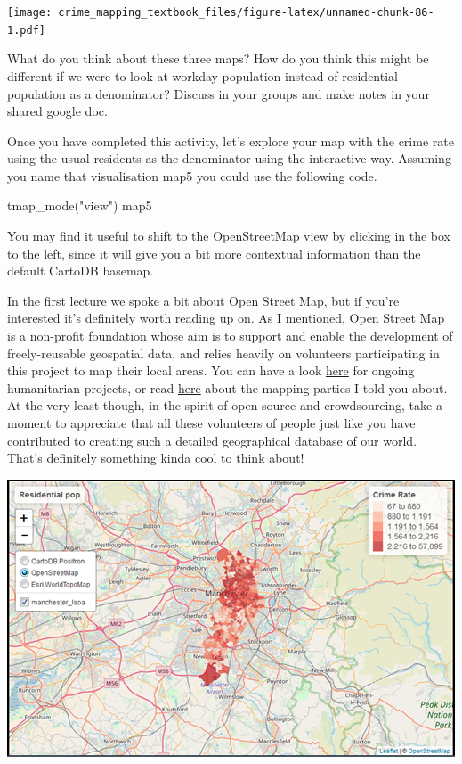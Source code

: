\documentclass[
]{book}
\newenvironment{Shaded}{\begin{snugshade}}{\end{snugshade}}
\newcommand{\FunctionTok}[1]{\textcolor[rgb]{0.00,0.00,0.00}{#1}}
\newcommand{\NormalTok}[1]{#1}
\newcommand{\StringTok}[1]{\textcolor[rgb]{0.31,0.60,0.02}{#1}}
\begin{document}
\texttt{[image: crime\_mapping\_textbook\_files/figure-latex/unnamed-chunk-86-1.pdf]}

What do you think about these three maps? How do you think this might be different if we were to look at workday population instead of residential population as a denominator? Discuss in your groups and make notes in your shared google doc.

Once you have completed this activity, let's explore your map with the crime rate using the usual residents as the denominator using the interactive way. Assuming you name that visualisation map5 you could use the following code.

\begin{Shaded}
\begin{Highlighting}[]
\FunctionTok{tmap\_mode}\NormalTok{(}\StringTok{"view"}\NormalTok{)}
\NormalTok{map5}
\end{Highlighting}
\end{Shaded}

You may find it useful to shift to the OpenStreetMap view by clicking in the box to the left, since it will give you a bit more contextual information than the default CartoDB basemap.

In the first lecture we spoke a bit about Open Street Map, but if you're interested it's definitely worth reading up on. As I mentioned, Open Street Map is a non-profit foundation whose aim is to support and enable the development of freely-reusable geospatial data, and relies heavily on volunteers participating in this project to map their local areas. You can have a look \href{https://www.hotosm.org/get-involved/disaster-mapping}{here} for ongoing humanitarian projects, or read \href{https://wiki.openstreetmap.org/wiki/Mapping_parties}{here} about the mapping parties I told you about. At the very least though, in the spirit of open source and crowdsourcing, take a moment to appreciate that all these volunteers of people just like you have contributed to creating such a detailed geographical database of our world. That's definitely something kinda cool to think about!

\includegraphics{img/shiftingbasemap.png}
\end{document}
